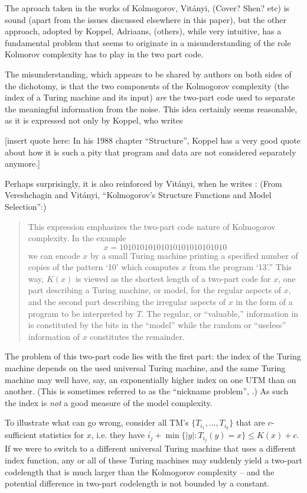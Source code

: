 \documentclass{article}
\begin{document}
The aproach taken in the works of Kolmogorov, Vit\'anyi, (Cover? Shen? etc) is sound (apart from the issues discussed elsewhere in this paper), but the other approach, adopted by Koppel, Adriaans, (others), while very intuitive, has a fundamental problem that seems to originate in a misunderstanding of the role Kolmorov complexity has to play in the two part code.

The misunderstanding, which appears to be shared by authors on both sides of the dichotomy, is that the two components of the Kolmogorov complexity (the index of a Turing machine and its input) \emph{are} the two-part code used to separate the meaningful information from the noise. This idea certainly seems reasonable, as it is expressed not only by Koppel, who writes

[insert quote here: In his 1988 chapter ``Structure'', Koppel has a very good quote about how it is such a pity that program and data are not considered separately anymore.]

Perhaps surprisingly, it is also reinforced by Vit\'anyi, when he writes : (From Vereshchagin and Vit\'anyi, ``Kolmogorov’s Structure Functions and Model Selection'':)
\begin{quotation}
  This expression emphasizes the two-part code nature of Kolmogorov complexity. In the example
\[x=10101010101010101010101010\]
we can encode $x$ by a small Turing machine printing a specified number of copies of the pattern `10' which computes $x$ from the program `13'.” This way, $K(x)$ is viewed as the shortest length of a two-part code for $x$, one part describing a Turing machine, or model, for the regular aspects of $x$, and the second part describing the irregular aspects of $x$ in the form of a program to be interpreted by $T$. The regular, or “valuable,” information in  is constituted by the bits in the “model” while the random or ``useless'' information of $x$ constitutes the remainder.
\end{quotation}

The problem of this two-part code lies with the first part: the index of the Turing machine depends on the used universal Turing machine, and the same Turing machine may well have, say, an exponentially higher index on one UTM than on another. (This is sometimes referred to as the ``nickname problem'', \cite{TODO}.) As such the index is \emph{not} a good measure of the model complexity. 

To illustrate what can go wrong, consider all TM's $\{T_{i_1}, \ldots, T_{i_k}\}$  that are $c$-sufficient statistics for $x$, i.e. they have $\overline{i_j}+\min\{|y|:T_{i_j}(y)=x\}\le K(x)+c$. If we were to switch to a different universal Turing machine that uses a different index function, any or all of these Turing machines may suddenly yield a two-part codelength that is much larger than the Kolmogorov complexity -- and the potential difference in two-part codelength is not bounded by a constant.
\end{document}
